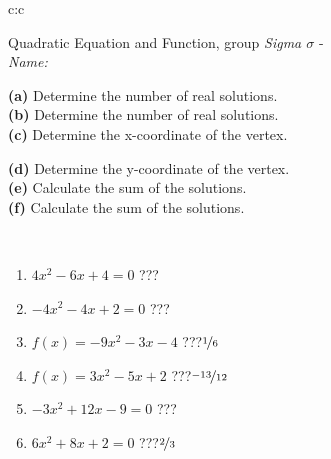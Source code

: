 \documentclass[10pt]{report}
\begin{document}
\begin{tabular}{c:c}
\begin{minipage}[c][104.5mm][t]{0.5\linewidth}
\begin{center}
\vspace{7mm}
{\huge {\LARGE Quadratic Equation and Function}, group \textit{Sigma $\sigma$} -}\\[5mm]
\textit{Name:}\phantom{xxxxxxxxxxxxxxxxxxxxxxxxxxxxxxxxxxxxxxxxxxxxxxxxxxxxxxxxxxxxxxxxx}\\[5mm]
\begin{minipage}{0.95\linewidth}
\begin{center}
{\small \begin{minipage}{0.5\textwidth}
\textbf{(a)} Determine the number of real solutions. \\[1mm]
\textbf{(b)} Determine the number of real solutions. \\[1mm]
\textbf{(c)} Determine the x-coordinate of the vertex.
\end{minipage} \begin{minipage}{0.49\textwidth}
\textbf{(d)} Determine the y-coordinate of the vertex. \\[1mm]
\textbf{(e)} Calculate the sum of the solutions. \\[1mm]
\textbf{(f)} Calculate the sum of the solutions.
\end{minipage}
}
\end{center}
\end{minipage}
\\[4mm]
\begin{minipage}{0.79\linewidth}
\begin{center}
\begin{varwidth}{\linewidth}
\begin{enumerate}
\Large
\item $4x^2-6x+4=0$\quad \dotfill\; ???\;\dotfill {}
\item $-4x^2-4x+2=0$\quad \dotfill\; ???\;\dotfill {}
\item $f(x)=-9x^2-3x-4$\quad \dotfill\; ???\;\dotfill \quad $\nicefrac{1}{6}$
\item $f(x)=3x^2-5x+2$\quad \dotfill\; ???\;\dotfill \quad $\nicefrac{-13}{12}$
\item $-3x^2+12x-9=0$\quad \dotfill\; ???\;\dotfill {}
\item $6x^2+8x+2=0$\quad \dotfill\; ???\;\dotfill \quad $\nicefrac{2}{3}$
\end{enumerate}
\end{varwidth}

\end{center}
\end{minipage}
\end{center}
\end{minipage}
\end{tabular}
\end{document}
